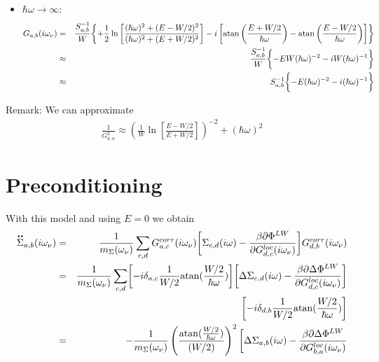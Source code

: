 \documentclass[11pt,a4paper]{report}
\begin{document}
\begin{itemize}
%
\item $\hbar\omega\rightarrow \infty$:
\begin{eqnarray}
G_{a,b}(i\omega_\nu)&=&
\frac{S^{-1}_{a,b}}{W}
\biggl\lbrace
+\frac{1}{2}\ln\left[
\frac{(\hbar\omega)^2+(E-W/2)^2}{(\hbar\omega)^2+(E+W/2)^2}
\right]
-i \left[\atan\left(\frac{E+W/2}{\hbar\omega}\right)
-\atan\left(\frac{E-W/2}{\hbar\omega}\right)\right]
\biggr\rbrace
\nonumber\\
%
&\approx&
\frac{S^{-1}_{a,b}}{W}
\biggl\lbrace
-EW(\hbar\omega)^{-2}
-i W (\hbar\omega)^{-1}
\biggr\rbrace
%
\nonumber\\
&\approx&
S^{-1}_{a,b}
\biggl\lbrace
-E(\hbar\omega)^{-2}
-i  (\hbar\omega)^{-1}
\biggr\rbrace
\end{eqnarray}
\end{itemize}


Remark: We can approximate
\begin{eqnarray}
\frac{1}{G_{a,a}^2}\approx \left(
\frac{1}{W}\ln\left[\frac{E-W/2}{E+W/2}\right] \right)^{-2}
  +(\hbar\omega)^2
\end{eqnarray}

\section{Preconditioning}
With this model and using $E=0$ we obtain
\begin{eqnarray*}
\ddot{\Sigma}_{a,b}(i\omega_\nu)
&=&
\frac{1}{m_\Sigma(\omega_\nu)}
\sum_{c,d}
G^{corr}_{a,c}(i\omega_\nu)
\biggl[\Sigma_{c,d}(i\omega)
-\frac{\beta\partial \Phi^{LW}}{\partial{G}^{loc}_{d,c}(i\omega_\nu)}
\biggr]
G^{corr}_{d,b}(i\omega_\nu)
\nonumber\\
&=&
\frac{1}{m_\Sigma(\omega_\nu)}
\sum_{c,d}
\biggl[-i\delta_{a,c} \frac{1}{W/2}\atan(\frac{W/2}{\hbar\omega})\biggr]
\biggl[\Delta\Sigma_{c,d}(i\omega)
-\frac{\beta\partial \Delta\Phi^{LW}}{\partial{G}^{loc}_{d,c}(i\omega_\nu)}
\biggr]
\nonumber\\
&&
\biggl[-i\delta_{d,b} \frac{1}{W/2}\atan(\frac{W/2}{\hbar\omega})\biggr]
\nonumber\\
&=&
-\frac{1}{m_\Sigma(\omega_\nu)}
\left(\frac{\atan(\frac{W/2}{\hbar\omega})}{(W/2)}\right)^2
\biggl[\Delta\Sigma_{a,b}(i\omega)
-\frac{\beta\partial \Delta\Phi^{LW}}{\partial{G}^{loc}_{b,a}(i\omega_\nu)}
\end{eqnarray*}
\end{document}
